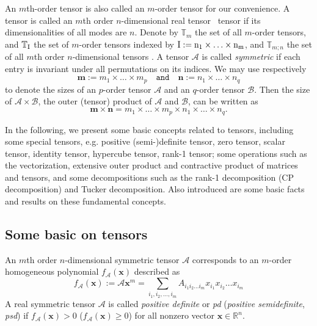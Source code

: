 \documentclass[11pt, oneside]{article}  %
\newcommand{\RR}{\mathbb{R}}
\newcommand{\TT}{\mathbb{T}}
\newcommand{\A}{\mathcal{A}}
\newcommand{\B}{\mathcal{B}}
\newcommand{\bfm}{\textbf{m}}
\newcommand{\bfn}{\textbf{n}}
\newcommand{\bx}{\textbf{x}}
\newcommand{\rmI}{\rm{I}}
\newcommand{\mnts}{$m$th order $n$-dimensional tensors }
\newcommand{\mnrt}{$m$th order $n$-dimensional real tensor }
\newcommand{\mnst}{$m$th order $n$-dimensional symmetric tensor }
\newcommand{\beq}{\begin{equation}}
\newcommand{\eeq}{\end{equation}}
\begin{document}
An $m$th-order tensor is also called an $m$-order tensor for our convenience.  A tensor is called an \mnrt\ tensor if its dimensionalities of all 
modes are $n$.  Denote by $\TT_{m}$ the set of all $m$-order tensors, and $\TT_{\rmI}$ the set of $m$-order tensors indexed by 
$\rmI:= n_1\times\ldots \times n_m$, and $\TT_{m;n}$ the set of all  \mnts.  A tensor $\A$ is called \emph{symmetric} if each entry is invariant 
under all permutations on its indices.  We may use respectively  
\[
\bfm:=m_{1}\times \ldots \times m_{p}\quad \texttt{and} \quad \bfn:=n_{1}\times \ldots \times n_{q}
\]
to denote the sizes of an $p$-order tensor $\A$ and an $q$-order tensor $\B$.  Then the size of $\A\times \B$, the outer (tensor) product of $\A$ 
and $\B$, can be written as 
\[
\bfm\times \bfn=m_{1}\times \ldots \times m_{p}\times n_{1}\times \ldots \times n_{q}. 
\]

In the following, we present some basic concepts related to tensors, including some special tensors, e.g. positive (semi-)definite tensor, zero tensor, 
scalar tensor, identity tensor, hypercube tensor, rank-1 tensor; some operations such as the vectorization, extensive outer product and contractive 
product of matrices and tensors, and some decompositions such as the rank-1 decomposition (CP decomposition) and Tucker decomposition. Also 
introduced are some basic facts and results on these fundamental concepts.  

\subsection{Some basic on tensors}
\label{sec2-1}
\setcounter{equation}{0}  
 
An \mnst $\A$ corresponds to an $m$-order homogeneous polynomial $f_{\A}(\bx)$ described as
\beq\label{eq2-1}
f_{\A}(\bx):=\A\bx^m=\sum\limits_{i_1,i_2,\ldots,i_m} A_{i_1i_2\ldots i_m}x_{i_1}x_{i_2}\ldots x_{i_m}
\eeq 
A real symmetric tensor $\A$ is called \emph{positive definite} or \emph{pd} (\emph{positive semidefinite}, \emph{psd}) if  $f_{\A}(\bx)>0$ 
($f_{\A}(\bx)\ge 0$) for all  nonzero vector $\bx\in\RR^n$.  
\end{document}
